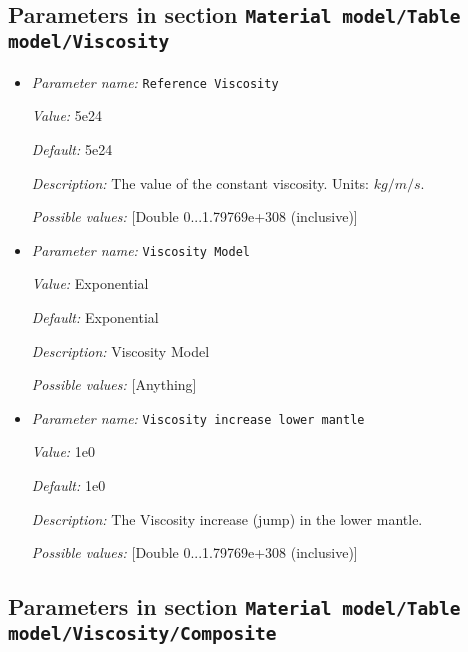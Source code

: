 \subsection{Parameters in section \tt Material model/Table model/Viscosity}
\label{parameters:Material_20model/Table_20model/Viscosity}

\begin{itemize}
\item {\it Parameter name:} {\tt Reference Viscosity}


{\it Value:} 5e24


{\it Default:} 5e24


{\it Description:} The value of the constant viscosity. Units: $kg/m/s$.


{\it Possible values:} [Double 0...1.79769e+308 (inclusive)]
\item {\it Parameter name:} {\tt Viscosity Model}


{\it Value:} Exponential


{\it Default:} Exponential


{\it Description:} Viscosity Model


{\it Possible values:} [Anything]
\item {\it Parameter name:} {\tt Viscosity increase lower mantle}


{\it Value:} 1e0


{\it Default:} 1e0


{\it Description:} The Viscosity increase (jump) in the lower mantle.


{\it Possible values:} [Double 0...1.79769e+308 (inclusive)]
\end{itemize}



\subsection{Parameters in section \tt Material model/Table model/Viscosity/Composite}
\label{parameters:Material_20model/Table_20model/Viscosity/Composite}

